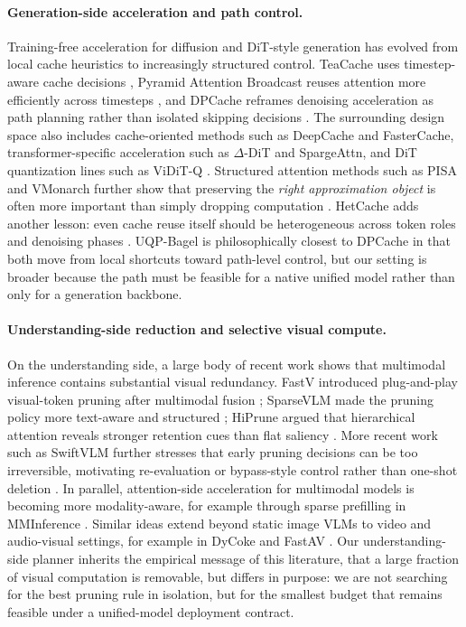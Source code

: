 \documentclass{article}
\begin{document}
\paragraph{Generation-side acceleration and path control.} Training-free acceleration for diffusion and DiT-style generation has evolved from local cache heuristics to increasingly structured control. TeaCache uses timestep-aware cache decisions \citep{teacache}, Pyramid Attention Broadcast reuses attention more efficiently across timesteps \citep{pab}, and DPCache reframes denoising acceleration as path planning rather than isolated skipping decisions \citep{dpcache}. The surrounding design space also includes cache-oriented methods such as DeepCache and FasterCache, transformer-specific acceleration such as $\Delta$-DiT and SpargeAttn, and DiT quantization lines such as ViDiT-Q \citep{ma2024deepcache,lv2024fastercache,chen2024delta,zhang2025spargeattn,zhao2024vidit}. Structured attention methods such as PISA and VMonarch further show that preserving the \emph{right approximation object} is often more important than simply dropping computation \citep{pisa,vmonarch}. HetCache adds another lesson: even cache reuse itself should be heterogeneous across token roles and denoising phases \citep{hetcache}. UQP-Bagel is philosophically closest to DPCache in that both move from local shortcuts toward path-level control, but our setting is broader because the path must be feasible for a native unified model rather than only for a generation backbone.

\paragraph{Understanding-side reduction and selective visual compute.} On the understanding side, a large body of recent work shows that multimodal inference contains substantial visual redundancy. FastV introduced plug-and-play visual-token pruning after multimodal fusion \citep{fastv}; SparseVLM made the pruning policy more text-aware and structured \citep{sparsevlm}; HiPrune argued that hierarchical attention reveals stronger retention cues than flat saliency \citep{hiprune}. More recent work such as SwiftVLM further stresses that early pruning decisions can be too irreversible, motivating re-evaluation or bypass-style control rather than one-shot deletion \citep{swiftvlm}. In parallel, attention-side acceleration for multimodal models is becoming more modality-aware, for example through sparse prefilling in MMInference \citep{li2025mminference}. Similar ideas extend beyond static image VLMs to video and audio-visual settings, for example in DyCoke and FastAV \citep{dycoke,fastav}. Our understanding-side planner inherits the empirical message of this literature, that a large fraction of visual computation is removable, but differs in purpose: we are not searching for the best pruning rule in isolation, but for the smallest budget that remains feasible under a unified-model deployment contract.
\end{document}
